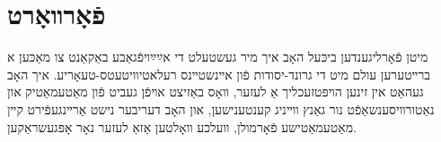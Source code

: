 \documentclass[11pt]{article}
\date{\today}
\title{}
\begin{document}
\tableofcontents

\section{פֿאָרװאָרט}
\label{sec:org1e8909a}
מיטן פֿאָרליגענדען ביכּעל האָב איך מיר געשטעלט די אײַײַױפֿגאַבע באַקאַנט צו
מאַכּען א ברײטערען עולם מיט די גרונד-יסודות פֿון אײנשטײנס
רעלאטיװיטעטס-טעאָריע. איך האָב געהאַט אין זינען הױפּטזעכליך אַ לעזער, װאָס
באַזיצט אױפֿן געביט פֿון מאַטעמאַטיק און נאַטורװיסענשאַפֿט נור גאַנץ װײניג
קענטענישען, און האָב דעריבער נישט אַרײנגעפֿירט קײן מאַטעמאַטישע פֿאָרמולן,
װעלכע װאָלטען אַזאַ לעזער נאָר אָפּגעשראַקען.
\end{document}
